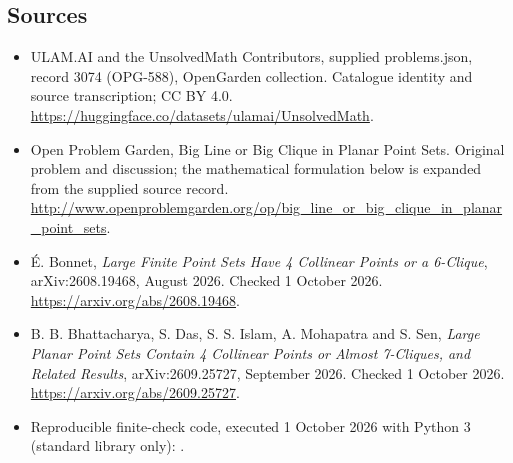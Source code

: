 \documentclass[11pt,a4paper]{article}
\begin{document}
\subsection{Sources}
\begin{itemize}
\item[S1] ULAM.AI and the UnsolvedMath Contributors, supplied problems.json, record 3074 (OPG-588), OpenGarden collection. Catalogue identity and source transcription; CC BY 4.0.
\url{https://huggingface.co/datasets/ulamai/UnsolvedMath}.
\item[S2] Open Problem Garden, Big Line or Big Clique in Planar Point Sets. Original problem and discussion; the mathematical formulation below is expanded from the supplied source record.
\url{http://www.openproblemgarden.org/op/big_line_or_big_clique_in_planar_point_sets}.
\item[S3] É. Bonnet, \emph{Large Finite Point Sets Have 4 Collinear Points or a 6-Clique}, arXiv:2608.19468, August 2026. Checked 1 October 2026.
\url{https://arxiv.org/abs/2608.19468}.
\item[S4] B. B. Bhattacharya, S. Das, S. S. Islam, A. Mohapatra and S. Sen, \emph{Large Planar Point Sets Contain 4 Collinear Points or Almost 7-Cliques, and Related Results}, arXiv:2609.25727, September 2026. Checked 1 October 2026.
\url{https://arxiv.org/abs/2609.25727}.
\item[C1] Reproducible finite-check code, executed 1 October 2026 with Python 3 (standard library only):
.
\end{itemize}
\end{document}
